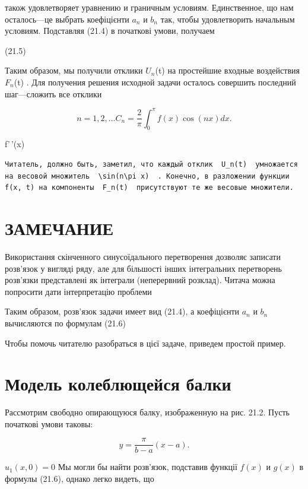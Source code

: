 \documentclass[
  ukrainian,
]{article}
\begin{document}
також удовлетворяет уравнению и граничным условиям. Единственное, що нам
осталось---це выбрать коефіцієнти \(a_n\) и \(b_n\) так, чтобы
удовлетворить начальным условиям. Подставляя (21.4) в початкові умови,
получаем

(21.5)

Таким образом, мы получили отклики \(U_n\)(t) на простейшие входные
воздействия \(F_n\)(t) . Для получения решения исходной задачи осталось
совершить последний шаг---сложить все отклики

\[
n = 1, 2, ...
C_n = \frac{2}{\pi} \int_0^{\pi} f(x) \cos(nx) dx.
\]

f'\,'(x)

\begin{verbatim}
Читатель, должно быть, заметил, что каждый отклик  U_n(t)  умножается на весовой множитель  \sin(n\pi x)  . Конечно, в разложении функции f(x, t) на компоненты  F_n(t)  присутствуют те же весовые множители.
\end{verbatim}

\section{ЗАМЕЧАНИЕ}\label{ux437ux430ux43cux435ux447ux430ux43dux438ux435}

Використання скінченного синусоїдального перетворення дозволяє записати
розв'язок у вигляді ряду, але для більшості інших інтегральних
перетворень розв'язки представлені як інтеграли (неперервний розклад).
Читача можна попросити дати інтерпретацію проблеми

Таким образом, розв'язок задачи имеет вид (21.4), а коефіцієнти \(a_n\)
и \(b_n\) вычисляются по формулам (21.6)

Чтобы помочь читателю разобраться в цієї задаче, приведем простой
пример.

\section{Модель колеблющейся
балки}\label{ux43cux43eux434ux435ux43bux44c-ux43aux43eux43bux435ux431ux43bux44eux449ux435ux439ux441ux44f-ux431ux430ux43bux43aux438}

Рассмотрим свободно опирающуюся балку, изображенную на рис. 21.2. Пусть
початкові умови таковы:

\[
y = \frac{\pi}{b-a}(x-a).
\]

\(u_1(x, 0) = 0\) Мы могли бы найти розв'язок, подставив функції
\(f(x)\) и \(g(x)\) в формулы (21.6), однако легко видеть, що
\end{document}
